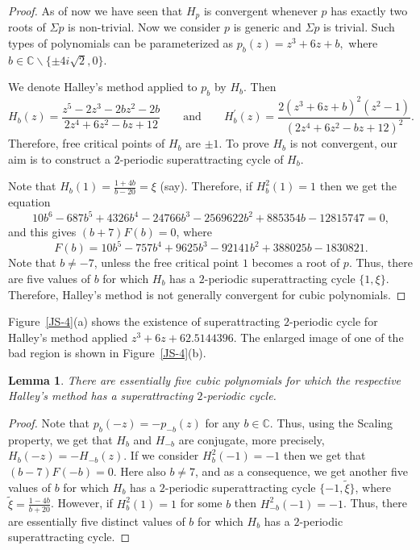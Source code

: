 \documentclass[12pt]{article}
\newtheorem{lem}{Lemma}[section]
\begin{document}
\begin{proof}
	As of now we have seen that $H_{p}$ is convergent whenever $p$ has exactly two roots of $\Sigma p$ is non-trivial. Now we consider $p$ is generic and $\Sigma p$ is trivial. Such types of polynomials can be parameterized as $p_b(z)=z^3+6z+b,$
where $b \in \mathbb{C} \backslash\{ \pm 4 i \sqrt{2}, 0\}$.
\par We denote Halley's method applied to $p_b$ by $H_b$.
Then
$$
H_{b}(z)=\frac{z^{5}-2 z^{3}-2 b z^{2}-2 b}{2 z^{4}+6 z^{2}-b z+12} \qquad \text {and} \qquad
H_{b}^{\prime}(z)=\frac{2\left(z^{3}+6 z+b\right)^{2}\left(z^{2}-1\right)}{\left(2 z^{4}+6 z^{2}-b z+12\right)^{2}} .
$$
Therefore, free critical points of $H_{b}$ are $\pm 1$. To prove $ H_b $ is not convergent, our aim is to construct a $ 2 $-periodic superattracting cycle of $ H_b $.

Note that $H_{b}(1)=\frac{1+4 b}{b-20}=\xi$ (say).
Therefore, if $H_{b}^{2}(1)=1$ then we get the equation
$$10 b^{6}-687 b^{5}+4326 b^{4}-24766 b^{3}-2569622b^{2}+885354 b-12815747=0,$$ and this gives
$(b+7) F(b)=0$,
where $$F(b)=10 b^{5}-757 b^{4}+9625 b^{3}-92141 b^{2}+388025 b-1830821.$$
Note that $b \neq-7$, unless the free critical point $ 1 $ becomes a root of $p$.
Thus, there are five values of $b$ for which $ H_b $ has a $2$-periodic superattracting cycle
$\{1, \xi\}$. Therefore, Halley's method is not generally convergent for cubic polynomials.
\end{proof}
Figure~\ref{JS-4}(a) shows the existence of superattracting $2$-periodic cycle for Halley's method applied $z^3+6z+62.5144396$. The enlarged image of one of the bad region is shown in Figure~\ref{JS-4}(b).
\begin{lem}
There are essentially five cubic polynomials for which the respective Halley's method has a superattracting $2$-periodic cycle.
\end{lem}
\begin{proof}
Note that $p_b(-z)=-p_{-b}(z)$ for any $b\in \mathbb{C}$. Thus, using the Scaling property, we get that $H_b$ and $H_{-b}$ are conjugate, more precisely, $H_b(-z)=-H_{-b}(z)$.
If we consider $H_{b}^{2}(-1)=-1$ then we get that $(b-7) F(-b)=0$. Here also $b \neq 7$, and as a consequence, we get another five values of $b$ for which $ H_b $ has a $ 2 $-periodic superattracting cycle $\{-1, \tilde{\xi} \}$, where $\tilde{\xi}=\frac{1-4 b}{b+20}$. However, if $H_b^2(1)=1$ for some $b$ then $H_{-b}^2(-1)=-1$.
Thus, there are essentially five distinct values of $b$ for which $H_{b}$ has a $2$-periodic superattracting cycle.
\end{proof}
\end{document}
